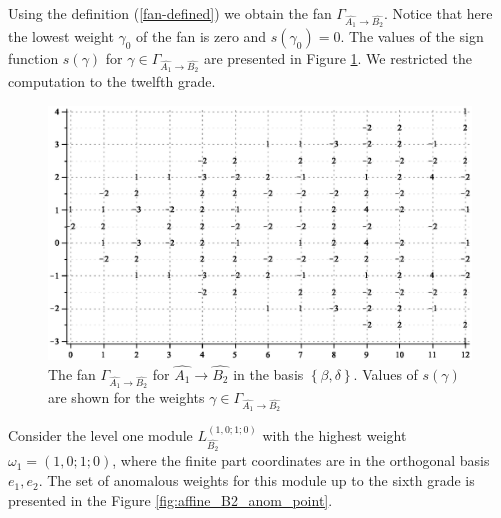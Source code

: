 \documentclass[12pt]{iopart}
\theoremstyle{definition}
\begin{document}
Using the definition (\ref{fan-defined}) we obtain the fan
$\Gamma_{\hat{A_1} \longrightarrow  \hat{B_2} }$.
Notice that here the lowest weight  $\gamma_0$ of the fan  is zero and $s\left( \gamma_0 \right)=0$.
The values of the sign function $s(\gamma)$ for
$ \gamma \in \Gamma_{\hat{A_1} \longrightarrow  \hat{B_2} }$ are presented in Figure \ref{fig:AffineB2A1Fan}.
We restricted the computation to the twelfth grade.
\begin{figure}[h!bt]
  \centering
  \includegraphics[width=135mm]{figure10.eps}
  \caption{The fan $\Gamma_{\hat{A_1}\rightarrow \hat{B_2}}$
  for $\hat{A_1}\rightarrow \hat{B_2}$ in the basis $\left\{\beta,\delta \right\}$. Values of  $s(\gamma)$ are shown for the
  weights $\gamma\in \Gamma_{\hat{A_1}\rightarrow \hat{B_2}}$}
  \label{fig:AffineB2A1Fan}
\end{figure}


Consider the level one module $L^{\left( 1,0;1;0 \right)}_{\hat{B_2}}$  with the highest weight $\omega_1=(1,0;1;0)$,
where the finite part coordinates are in the orthogonal basis $e_1,e_2$.
The set of anomalous weights for this module up to the sixth grade is presented in the Figure \ref{fig:affine_B2_anom_point}.
\end{document}
